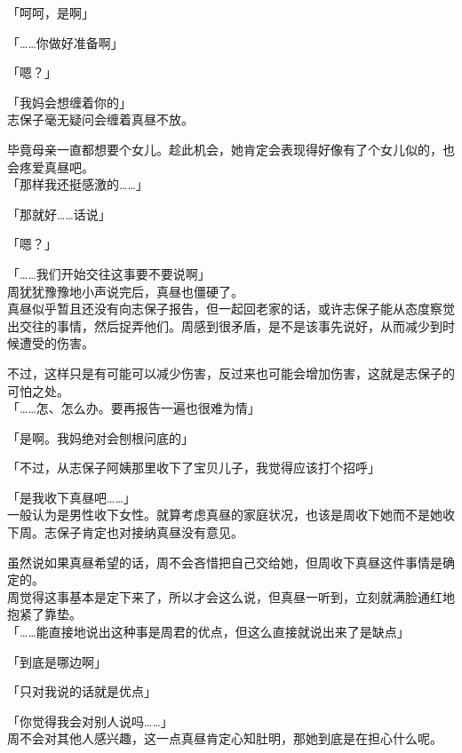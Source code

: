 「呵呵，是啊」

「……你做好准备啊」

「嗯？」

「我妈会想缠着你的」\\

志保子毫无疑问会缠着真昼不放。

毕竟母亲一直都想要个女儿。趁此机会，她肯定会表现得好像有了个女儿似的，也会疼爱真昼吧。\\

「那样我还挺感激的……」

「那就好……话说」

「嗯？」

「……我们开始交往这事要不要说啊」\\

周犹犹豫豫地小声说完后，真昼也僵硬了。\\

真昼似乎暂且还没有向志保子报告，但一起回老家的话，或许志保子能从态度察觉出交往的事情，然后捉弄他们。周感到很矛盾，是不是该事先说好，从而减少到时候遭受的伤害。

不过，这样只是有可能可以减少伤害，反过来也可能会增加伤害，这就是志保子的可怕之处。\\

「……怎、怎么办。要再报告一遍也很难为情」

「是啊。我妈绝对会刨根问底的」

「不过，从志保子阿姨那里收下了宝贝儿子，我觉得应该打个招呼」

「是我收下真昼吧……」\\

一般认为是男性收下女性。就算考虑真昼的家庭状况，也该是周收下她而不是她收下周。志保子肯定也对接纳真昼没有意见。

虽然说如果真昼希望的话，周不会吝惜把自己交给她，但周收下真昼这件事情是确定的。\\

周觉得这事基本是定下来了，所以才会这么说，但真昼一听到，立刻就满脸通红地抱紧了靠垫。\\

「……能直接地说出这种事是周君的优点，但这么直接就说出来了是缺点」

「到底是哪边啊」

「只对我说的话就是优点」

「你觉得我会对别人说吗……」\\

周不会对其他人感兴趣，这一点真昼肯定心知肚明，那她到底是在担心什么呢。\\

